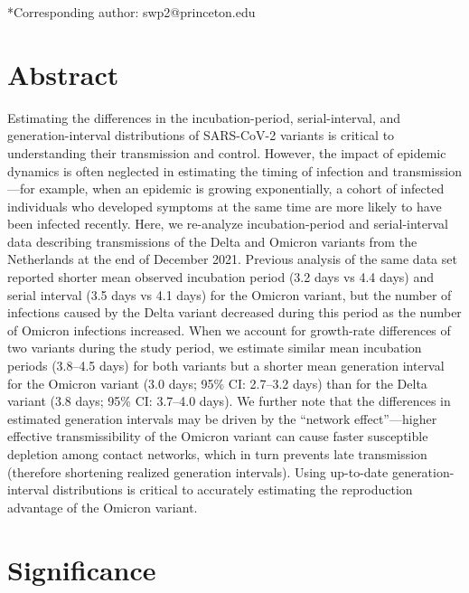 \documentclass[12pt]{article}
\begin{document}
\begin{flushleft}{
	\Large
	\textbf{}
}
*Corresponding author: swp2@princeton.edu
\bigskip

\section*{Abstract}

Estimating the differences in the incubation-period, serial-interval, and generation-interval distributions of SARS-CoV-2 variants is critical to understanding their transmission and control.
However, the impact of epidemic dynamics is often neglected in estimating the timing of infection and transmission---for example, when an epidemic is growing exponentially, a cohort of infected individuals who developed symptoms at the same time are more likely to have been infected recently.
Here, we re-analyze incubation-period and serial-interval data describing transmissions of the Delta and Omicron variants from the Netherlands at the end of December 2021.
Previous analysis of the same data set reported shorter mean observed incubation period (3.2 days vs 4.4 days) and serial interval (3.5 days vs 4.1 days) for the Omicron variant, but the number of infections caused by the Delta variant decreased during this period as the number of Omicron infections increased.
When we account for growth-rate differences of two variants during the study period, we estimate similar mean incubation periods (3.8--4.5 days) for both variants but a shorter mean generation interval for the Omicron variant (3.0 days; 95\% CI: 2.7--3.2 days) than for the Delta variant (3.8 days; 95\% CI: 3.7--4.0 days).
We further note that the differences in estimated generation intervals may be driven by the ``network effect''---higher effective transmissibility of the Omicron variant can cause faster susceptible depletion among contact networks, which in turn prevents late transmission (therefore shortening realized generation intervals).
Using up-to-date generation-interval distributions is critical to accurately estimating the reproduction advantage of the Omicron variant.

\section*{Significance}


\end{flushleft}
\end{document}
